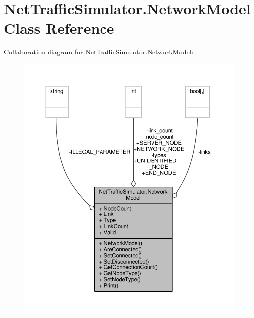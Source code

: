 \hypertarget{classNetTrafficSimulator_1_1NetworkModel}{\section{Net\-Traffic\-Simulator.\-Network\-Model Class Reference}
\label{classNetTrafficSimulator_1_1NetworkModel}
}


Collaboration diagram for Net\-Traffic\-Simulator.\-Network\-Model\-:\nopagebreak
\begin{figure}[H]
\begin{center}
\leavevmode
\includegraphics[width=350pt]{classNetTrafficSimulator_1_1NetworkModel__coll__graph}
\end{center}
\end{figure}
